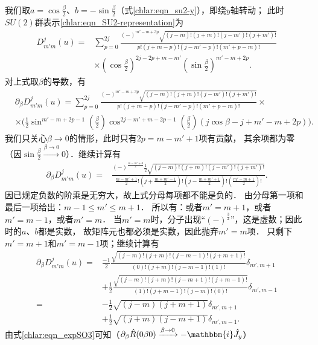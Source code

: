 我们取$a=\cos \frac{\beta}{2}$、$b=-\sin \frac{\beta}{2}$（式\eqref{chlar:eqn_su2-y}），即绕$y$轴转动；
此时$SU(2)$群表示\eqref{chlar:eqn_SU2-representation}为
\begin{align*}
    D^{j}_{m'm}(u) =&  \sum_{p=0}^{2j}  
    \frac{(-)^{m'-m+3p}  \sqrt{(j-m)! (j+m)! (j-m')! (j+m')!}   } 
    {p!(j+m-p)! (j-m'-p)! (m'+p-m)!} \\
    & \times \left(\cos \frac{\beta}{2}\right)^{2j-2p+m-m'} 
    \left(\sin \frac{\beta}{2}\right)^{m'-m+2p}.
\end{align*}
对上式取$\beta$的导数，有
\begin{align*}
    &\partial_\beta D^{j}_{m'm}(u) =  \sum_{p=0}^{2j}  
    \frac{(-)^{m'-m+3p}  \sqrt{(j-m)! (j+m)! (j-m')! (j+m')!}   } 
    {p!(j+m-p)! (j-m'-p)! (m'+p-m)!} \times \\
    & \times \biggl(\frac{1}{2} \sin ^{m'-m+2 p-1}\left(\frac{\beta }{2}\right) 
    \cos ^{2 j-m'+m-2 p-1}\left(\frac{\beta }{2}\right) \left(j \cos \beta -j+m'-m+2 p\right)\biggr).
\end{align*}
我们只关心$\beta\to 0$的情形，此时只有$2 p=m-m'+1$项有贡献，
其余项都为零（因$\sin\frac{\beta}{2} \xrightarrow{\beta \to 0}0$）．继续计算有
\begin{align*}
    \partial_\beta D^{j}_{m'm}(u) =&  \frac{(-)^{\frac{m-m'+3}{2}} \frac{1}{2} 
        \sqrt{(j-m)! (j+m)! (j-m')! (j+m')!}   } 
    {\frac{m-m'+1}{2}!(j+\frac{m+m'-1}{2})! (j-\frac{m+m'+1}{2})! (\frac{m'-m+1}{2})!} .
\end{align*}
因已规定负数的阶乘是无穷大，故上式分母每项都不能是负的．
由分母第一项和最后一项给出：$m-1\leqslant m' \leqslant m+1$．
所以有：或者$m'=m+1$，或者$m'=m-1$，或者$m'=m$．
当$m'=m$时，分子出现“$(-)^{\frac{3}{2}}$”，这是虚数；因此时的$a$、$b$都是实数，
故矩阵元也都必须是实数，因此抛弃$m'=m$项．
只剩下$m'=m+1$和$m'=m-1$项；继续计算有
\begin{align*}
    \partial_\beta D^{j}_{m'm}(u) =&  
    \frac{-1}{2}\frac{ \sqrt{(j-m)! (j+m)! (j-m-1)! (j+m+1)!}   } 
    {(0)!(j+m)! (j-m-1)! (1)!} \delta_{m',m+1}\\
    &+\frac{1}{2}\frac{ \sqrt{(j-m)! (j+m)! (j-m+1)! (j+m-1)!}   } 
    {(1)!(j+m-1)!(j-m)!(0)!} \delta_{m',m-1}\\
    =&-\frac{1}{2}\sqrt{(j-m)(j+m+1)}\delta_{m',m+1}\\
    &+\frac{1}{2}\sqrt{ (j+m) (j-m+1)}\delta_{m',m-1}.
\end{align*}
由式\eqref{chlar:eqn_expSO3}可知（$\partial_\beta \hat{R}(0\beta 0)\xrightarrow{\beta\to 0}-\mathbbm{i}\hat{J}_y$）
